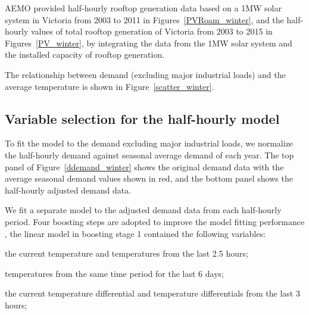 \documentclass[11pt]{article}
\begin{document}
AEMO provided half-hourly rooftop generation data based on a 1MW solar system in Victoria from 2003 to 2011 in Figures~\ref{PVRoam_winter}, and the half-hourly values of total rooftop generation of Victoria from 2003 to 2015 in Figures~\ref{PV_winter}, by integrating the data from the 1MW solar system and the installed capacity of rooftop generation. 




The relationship between demand (excluding major industrial loads) and the average temperature is shown in Figure~\ref{scatter_winter}.



\subsection{Variable selection for the half-hourly model}

To fit the model to the demand excluding major industrial loads, we normalize the half-hourly demand against seasonal average demand of each year. The top panel of Figure~\ref{ddemand_winter} shows the original demand data with the average seasonal demand values shown in red, and the bottom panel shows the half-hourly adjusted demand data.


We fit a separate model to the adjusted demand data from each half-hourly period. Four boosting steps are adopted to improve the model fitting performance \citep{Tech15}, the linear model in boosting stage 1 contained the following variables:
\biz\itemsep=0cm
\item the current temperature and temperatures from the last 2.5 hours;

\item temperatures from the same time period for the last 6 days;

\item the current temperature differential and temperature differentials from the last 3 hours;
\end{document}
